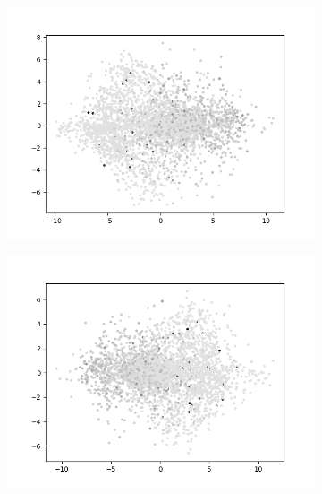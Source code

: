\begin{figure}[H]
\begin{subfigure}{.25\textwidth}
        \includegraphics[width=\textwidth]{images/figures/experiments_latent/pooling_dim128_PCA_dsm.png}
    \end{subfigure}%
    \begin{subfigure}{.25\textwidth}
        \centering
        \includegraphics[width=\textwidth]{images/figures/experiments_latent/pooling_dim50_PCA_dsm.png}
    \end{subfigure}
    \begin{subfigure}{.25\textwidth}
        \centering

\end{subfigure}
\end{figure}
